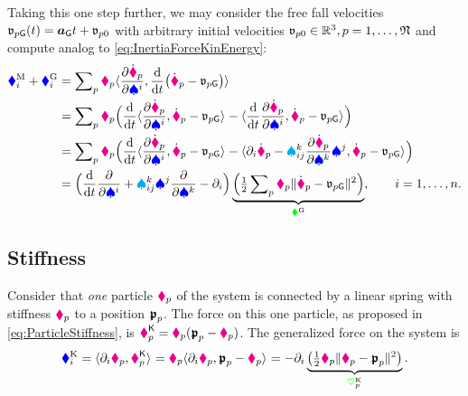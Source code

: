 \newcommand{\particleVelGravity}[1]{\particleStyle{v}_{#1\idxText{G}}}
Taking this one step further, we may consider the free fall velocities $\particleVelGravity{\PidxI}(t) = \gravityAcc t + \particleStyle{v}_{\PidxI 0}$ with arbitrary initial velocities $\mathfrak{v}_{p 0} \in \mathbb{R}^3, p=1,\ldots,\mathfrak{N}$ and compute analog to \eqref{eq:InertiaForceKinEnergy}:
\begin{align}
  \genForceInertiaCoeff{\LidxI} + \genForceGravityCoeff{\LidxI}
  &= \sumParticles \particleMass{\PidxI} \sProd{\pdiff[\particlePosd{\PidxI}]{\sysVelCoeff{\LidxI}}}{\diff{t}\big(\particlePosd{\PidxI} - \particleVelGravity{\PidxI} \big)}
 \nonumber\\
  &= \sumParticles \particleMass{\PidxI}  \Big( \diff{t} \sProd{\pdiff[\particlePosd{\PidxI}]{\sysVelCoeff{\LidxI}}}{\particlePosd{\PidxI} - \particleVelGravity{\PidxI}} - \sProd{\diff{t} \pdiff[\particlePosd{\PidxI}]{\sysVelCoeff{\LidxI}}}{\particlePosd{\PidxI} - \particleVelGravity{\PidxI}}\Big)
 \nonumber\\
  &= \sumParticles \particleMass{\PidxI}  \Big( \diff{t} \sProd{\pdiff[\particlePosd{\PidxI}]{\sysVelCoeff{\LidxI}}}{\particlePosd{\PidxI} - \particleVelGravity{\PidxI}} - \sProd{\dirDiff{\LidxI} \particlePosd{\PidxI} - \BoltzSym{\LidxIII}{\LidxI}{\LidxII} \pdiff[\particlePosd{\PidxI}]{\sysVelCoeff{\LidxIII}} \sysVelCoeff{\LidxII}}{\particlePosd{\PidxI} - \particleVelGravity{\PidxI}}\Big)
 \nonumber\\
  &= \Big(\diff{t} \pdiff{\sysVelCoeff{\LidxI}} + \BoltzSym{\LidxIII}{\LidxI}{\LidxII} \sysVelCoeff{\LidxII} \pdiff{\sysVelCoeff{\LidxIII}} - \dirDiff{\LidxI} \Big)
  \underbrace{\Big( \tfrac{1}{2} \sumParticles \particleMass{\PidxI} \norm{\particlePosd{\PidxI} - \particleVelGravity{\PidxI}}^2 \Big)}_{\kineticEnergyInertial},
  \qquad
  \LidxI = 1,\ldots,\dimConfigSpace.
\end{align}

\subsection{Stiffness}\label{sec:ParticleSysStiffness}
Consider that \textit{one} particle $\boldsymbol{\textcolor{magenta}{\blacklozenge}}_{p}$ of the system is connected by a linear spring with stiffness $\textcolor{magenta}{\blacklozenge}_{p}$ to a position $\boldsymbol{\mathfrak{p}}_{p}$.
The force on this one particle, as proposed in \eqref{eq:ParticleStiffness}, is $\boldsymbol{\textcolor{magenta}{\blacklozenge}}_{p}^{\mathsf{K}} = \textcolor{magenta}{\blacklozenge}_{p} (\boldsymbol{\mathfrak{p}}_{p} - \boldsymbol{\textcolor{magenta}{\blacklozenge}}_{p})$.
The generalized force on the system is
\begin{align}
 \textcolor{blue}{\blacklozenge}^{\mathrm{K}}_{i} 
 = \langle \partial_{i} \boldsymbol{\textcolor{magenta}{\blacklozenge}}_{p}, \boldsymbol{\textcolor{magenta}{\blacklozenge}}_{p}^{\mathsf{K}} \rangle_{} 
 = \textcolor{magenta}{\blacklozenge}_{p} \langle \partial_{i} \boldsymbol{\textcolor{magenta}{\blacklozenge}}_{p}, \boldsymbol{\mathfrak{p}}_{p} - \boldsymbol{\textcolor{magenta}{\blacklozenge}}_{p} \rangle_{}
 = -\partial_{i} \underbrace{\big( \tfrac{1}{2} \textcolor{magenta}{\blacklozenge}_{p} \| \boldsymbol{\textcolor{magenta}{\blacklozenge}}_{p} - \boldsymbol{\mathfrak{p}}_{p} \|_{}^2 \big)}_{\textcolor{green}{\heartsuit}^{\mathrm{K}}_{p}}.
\end{align}

